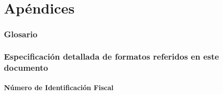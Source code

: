 \documentclass[11pt, a4paper, twoside, titlepage]{article}
\begin{document}
	\newpage
	\part*{Apéndices}
	\appendix
	\section{Glosario} \label{srs:glosario}
	\printglossary

	\newpage

	\newpage
	\section[Especificación detallada de formatos referidos]{Especificación detallada de formatos referidos en este documento}
		\subsection{Número de Identificación Fiscal} \label{srs:nif++}
			
			
	\newpage
	\nocite{IEEE:1074}
	\nocite{IEEE:830}
	
	
\end{document}
